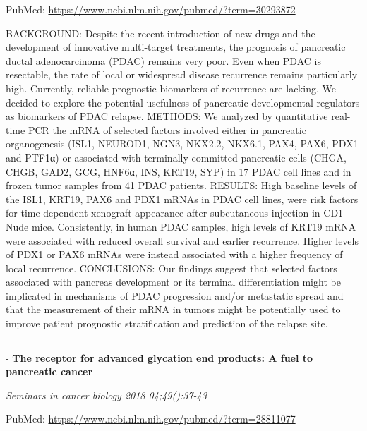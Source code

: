 \documentclass[]{article}
\begin{document}
PubMed: \url{https://www.ncbi.nlm.nih.gov/pubmed/?term=30293872}

BACKGROUND: Despite the recent introduction of new drugs and the
development of innovative multi-target treatments, the prognosis of
pancreatic ductal adenocarcinoma (PDAC) remains very poor. Even when
PDAC is resectable, the rate of local or widespread disease recurrence
remains particularly high. Currently, reliable prognostic biomarkers of
recurrence are lacking. We decided to explore the potential usefulness
of pancreatic developmental regulators as biomarkers of PDAC relapse.
METHODS: We analyzed by quantitative real-time PCR the mRNA of selected
factors involved either in pancreatic organogenesis (ISL1, NEUROD1,
NGN3, NKX2.2, NKX6.1, PAX4, PAX6, PDX1 and PTF1α) or associated with
terminally committed pancreatic cells (CHGA, CHGB, GAD2, GCG, HNF6α,
INS, KRT19, SYP) in 17 PDAC cell lines and in frozen tumor samples from
41 PDAC patients. RESULTS: High baseline levels of the ISL1, KRT19, PAX6
and PDX1 mRNAs in PDAC cell lines, were risk factors for time-dependent
xenograft appearance after subcutaneous injection in CD1-Nude mice.
Consistently, in human PDAC samples, high levels of KRT19 mRNA were
associated with reduced overall survival and earlier recurrence. Higher
levels of PDX1 or PAX6 mRNAs were instead associated with a higher
frequency of local recurrence. CONCLUSIONS: Our findings suggest that
selected factors associated with pancreas development or its terminal
differentiation might be implicated in mechanisms of PDAC progression
and/or metastatic spread and that the measurement of their mRNA in
tumors might be potentially used to improve patient prognostic
stratification and prediction of the relapse site.

{}

{}

\begin{center}\rule{0.5\linewidth}{\linethickness}\end{center}

 - \textbf{The receptor for advanced glycation end products: A fuel to
pancreatic cancer}

\emph{Seminars in cancer biology 2018 04;49():37-43}

PubMed: \url{https://www.ncbi.nlm.nih.gov/pubmed/?term=28811077}
\end{document}
